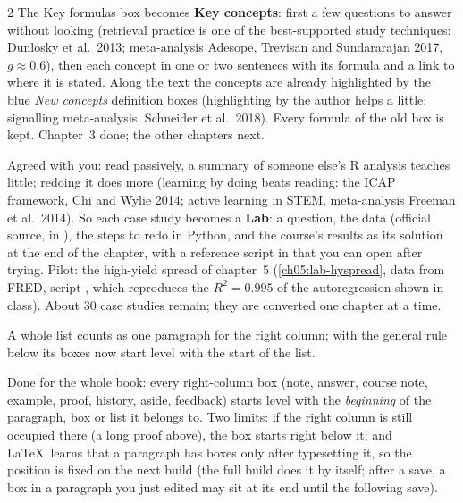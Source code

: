 \begin{paracol}{2}
{The Key formulas box becomes \textbf{Key concepts}: first a few questions to answer without looking (retrieval
practice is one of the best-supported study techniques: Dunlosky et al.\ 2013; meta-analysis Adesope, Trevisan and
Sundararajan 2017, $g\approx0.6$), then each concept in one or two sentences with its formula and a link to where it is
stated. Along the text the concepts are already highlighted by the blue \emph{New concepts} definition boxes
(highlighting by the author helps a little: signalling meta-analysis, Schneider et al.\ 2018). Every formula of the
old box is kept. Chapter~3 done; the other chapters next.}

{Agreed with you: read passively, a summary of someone else's R analysis teaches little; redoing it does more
(learning by doing beats reading: the ICAP framework, Chi and Wylie 2014; active learning in STEM, meta-analysis
Freeman et al.\ 2014). So each case study becomes a \textbf{Lab}: a question, the data (official source, in
), the steps to redo in Python, and the course's results as its solution at the end of the chapter, with a
reference script in  that you can open after trying. Pilot: the high-yield spread of chapter~5
(\cref{ch05:lab-hyspread}, data from FRED, script , which reproduces the $R^2=0.995$ of the
autoregression shown in class). About 30 case studies remain; they are converted one chapter at a time.}

{A whole list counts as one paragraph for the right column; with the general rule below its boxes now start
level with the start of the list.}

{Done for the whole book: every right-column box (note, answer, course note, example, proof, history, aside,
feedback) starts level with the \emph{beginning} of the paragraph, box or list it belongs to. Two limits: if the
right column is still occupied there (a long proof above), the box starts right below it; and \LaTeX\ learns that a
paragraph has boxes only after typesetting it, so the position is fixed on the next build (the full build does it
by itself; after a save, a box in a paragraph you just edited may sit at its end until the following save).}


\end{paracol}

